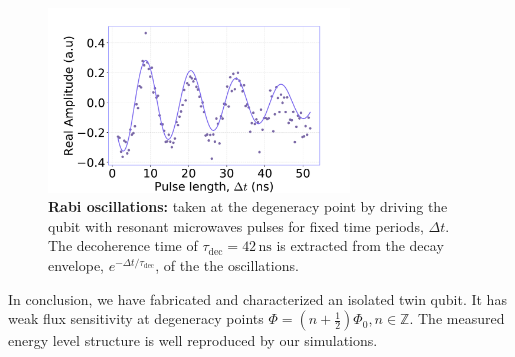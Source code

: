 \documentclass[%
reprint,
superscriptaddress,
bibnotes,
amsmath,
amssymb,
aps,
showkeys,
prb,
]{revtex4-2}
\newcommand{\iunit}[2]{\ensuremath{#1\,\text{#2}}}
\begin{document}
\begin{figure}
  \includegraphics[width=8cm]{fig5}
  \caption{\textbf{Rabi oscillations:}  taken at  the degeneracy point  by driving  the qubit
    with resonant microwaves pulses for fixed time periods, $ \Delta t $.  The decoherence time of
    $   \tau_{\text{dec}}  =   \iunit{42}{ns}  $   is   extracted  from   the  decay   envelope,
    $ e^{-\Delta t/\tau_{\text{dec}}} $, of the the oscillations. \label{fig:rabi}}
\end{figure}

In conclusion, we  have fabricated and  characterized an isolated  twin qubit.  It  has weak
flux  sensitivity at degeneracy  points
$ \Phi =  (n+\frac{1}{2})\Phi_0, n\in\mathbb{Z} $. The measured energy level structure is well reproduced by our simulations. 


\end{document}
